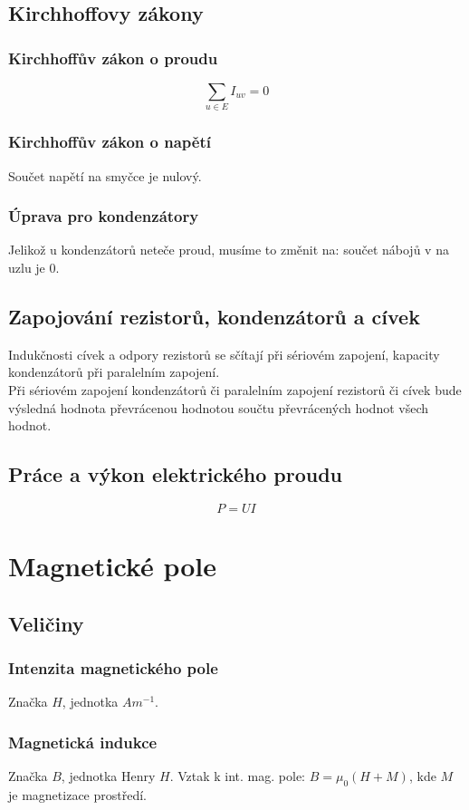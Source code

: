 \documentclass[titlepage]{report}
\begin{document}
\section{Kirchhoffovy zákony}
\subsection{Kirchhoffův zákon o proudu}
\begin{equation}\label{eq:random}
\sum_{u \in E} I_{uv} = 0
\end{equation}
\subsection{Kirchhoffův zákon o napětí}
Součet napětí na smyčce je nulový.
\subsection{Úprava pro kondenzátory}
Jelikož u kondenzátorů neteče proud, musíme to změnit na: součet nábojů v na uzlu je 0.
\section{Zapojování rezistorů, kondenzátorů a cívek}
Indukčnosti cívek a odpory rezistorů se sčítají při sériovém zapojení, kapacity kondenzátorů při paralelním zapojení.\\
Při sériovém zapojení kondenzátorů či paralelním zapojení rezistorů či cívek bude výsledná hodnota převrácenou hodnotou součtu převrácených hodnot všech hodnot.
\section{Práce a výkon elektrického proudu}
\begin{equation}
P = UI
\end{equation}
\chapter{Magnetické pole}
\section{Veličiny}
\subsection{Intenzita magnetického pole}
Značka $H$, jednotka $Am^{-1}$.
\subsection{Magnetická indukce}
Značka $B$, jednotka Henry $H$. Vztak k int. mag. pole: $B = \mu_0(H + M)$, kde $M$ je magnetizace prostředí.
\end{document}
